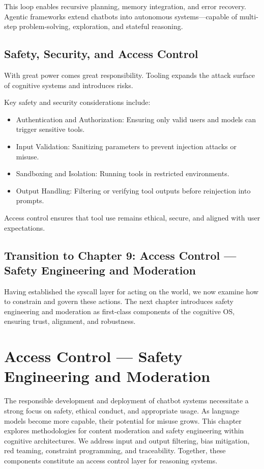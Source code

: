 \documentclass{book}
\begin{document}
This loop enables recursive planning, memory integration, and error recovery. Agentic frameworks extend chatbots into autonomous systems—capable of multi-step problem-solving, exploration, and stateful reasoning.

\section{Safety, Security, and Access Control}

With great power comes great responsibility. Tooling expands the attack surface of cognitive systems and introduces risks.

Key safety and security considerations include:

\begin{itemize}
  \item Authentication and Authorization: Ensuring only valid users and models can trigger sensitive tools.
  \item Input Validation: Sanitizing parameters to prevent injection attacks or misuse.
  \item Sandboxing and Isolation: Running tools in restricted environments.
  \item Output Handling: Filtering or verifying tool outputs before reinjection into prompts.
\end{itemize}

Access control ensures that tool use remains ethical, secure, and aligned with user expectations.

\section*{Transition to Chapter 9: Access Control — Safety Engineering and Moderation}

Having established the syscall layer for acting on the world, we now examine how to constrain and govern these actions. The next chapter introduces safety engineering and moderation as first-class components of the cognitive OS, ensuring trust, alignment, and robustness.

\chapter{Access Control — Safety Engineering and Moderation}

The responsible development and deployment of chatbot systems necessitate a strong focus on safety, ethical conduct, and appropriate usage. As language models become more capable, their potential for misuse grows. This chapter explores methodologies for content moderation and safety engineering within cognitive architectures. We address input and output filtering, bias mitigation, red teaming, constraint programming, and traceability. Together, these components constitute an access control layer for reasoning systems.
\end{document}
